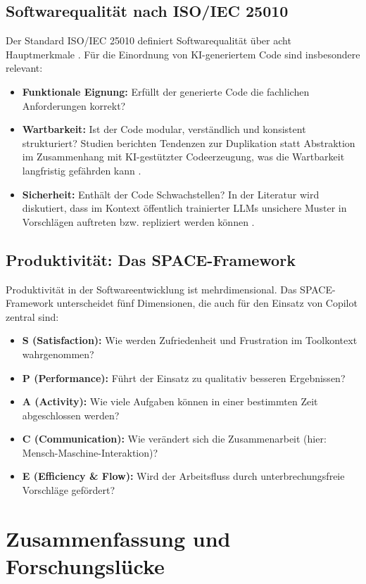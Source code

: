 \subsection{Softwarequalität nach ISO/IEC 25010}
Der Standard ISO/IEC 25010 definiert Softwarequalität über acht Hauptmerkmale \parencite{iso25010}. Für die Einordnung von KI-generiertem Code sind insbesondere relevant:
\begin{itemize}
    \item  \textbf{Funktionale Eignung:} Erfüllt der generierte Code die fachlichen Anforderungen korrekt?
    \item  \textbf{Wartbarkeit:} Ist der Code modular, verständlich und konsistent strukturiert? Studien berichten Tendenzen zur Duplikation statt Abstraktion im Zusammenhang mit KI-gestützter Codeerzeugung, was die Wartbarkeit langfristig gefährden kann \parencite{nadi2022humaicollab}.
    \item  \textbf{Sicherheit:} Enthält der Code Schwachstellen? In der Literatur wird diskutiert, dass im Kontext öffentlich trainierter LLMs unsichere Muster in Vorschlägen auftreten bzw. repliziert werden können \parencite{pearce2022asleep}.
\end{itemize}

\subsection{Produktivität: Das SPACE-Framework}
Produktivität in der Softwareentwicklung ist mehrdimensional. Das SPACE-Framework \parencite{forsgren2021space} unterscheidet fünf Dimensionen, die auch für den Einsatz von Copilot zentral sind:
\begin{itemize}
    \item  \textbf{S (Satisfaction):} Wie werden Zufriedenheit und Frustration im Toolkontext wahrgenommen?
    \item  \textbf{P (Performance):} Führt der Einsatz zu qualitativ besseren Ergebnissen?
    \item  \textbf{A (Activity):} Wie viele Aufgaben können in einer bestimmten Zeit abgeschlossen werden?
    \item  \textbf{C (Communication):} Wie verändert sich die Zusammenarbeit (hier: Mensch-Maschine-Interaktion)?
    \item  \textbf{E (Efficiency \& Flow):} Wird der Arbeitsfluss durch unterbrechungsfreie Vorschläge gefördert?
\end{itemize}

\section{Zusammenfassung und Forschungslücke}
\label{sec:related-work}


